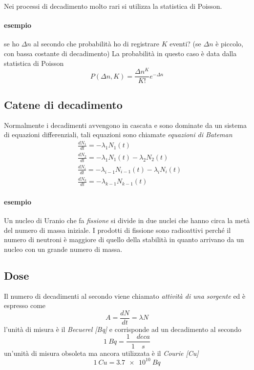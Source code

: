 Nei processi di decadimento molto rari si utilizza la statistica di Poisson.
\paragraph{esempio} se ho $\Delta n$ al secondo che probabilità ho di registrare $K$ eventi? (se $\Delta n$ è piccolo, con bassa costante di decadimento)
La probabilità in questo caso è data dalla statistica di Poisson
\begin{equation}
P(\Delta n, K) = \frac{\Delta n^K}{K!} e^{ -\Delta n }
\end{equation}

\subsection{Catene di decadimento}
Normalmente i decadimenti avvengono in cascata e sono dominate da un sistema di equazioni differenziali, tali equazioni sono chiamate \emph{equazioni di Bateman}
\begin{equation}
\begin{split}
& \frac{dN_1}{dt} = - \lambda_1 N_1(t) \\
& \frac{dN_2}{dt} = - \lambda_1 N_1(t) - \lambda_2 N_2(t) \\
& \frac{dN_i}{dt} = - \lambda_{i-1} N_{i-1}(t) - \lambda_i N_i(t) \\
& \frac{dN_k}{dt} = - \lambda_{k-1} N_{k-1}(t)
\end{split}
\label{bateman_equations}
\end{equation}

\paragraph{esempio} Un nucleo di Uranio che fa \emph{fissione} si divide in due nuclei che hanno circa la metà del numero di massa iniziale. I prodotti di fissione sono radioattivi perché il numero di neutroni è maggiore di quello della stabilità in quanto arrivano da un nucleo con un grande numero di massa.

\subsection{Dose}
Il numero di decadimenti al secondo viene chiamato \emph{attività di una sorgente} ed è espresso come 
$$ A = \frac{dN}{dt} = \lambda N $$ 
l'unità di misura è il \emph{Becuerel [Bq]} e corrisponde ad un decadimento al secondo
$$ \SI{1}{Bq} = \frac{1 \quad deca}{1 \quad s} $$
un'unità di misura obsoleta ma ancora utilizzata è il \emph{Courie [Cu]}
$$ \SI{1}{Cu} = \SI{3.7e10}{Bq} $$

